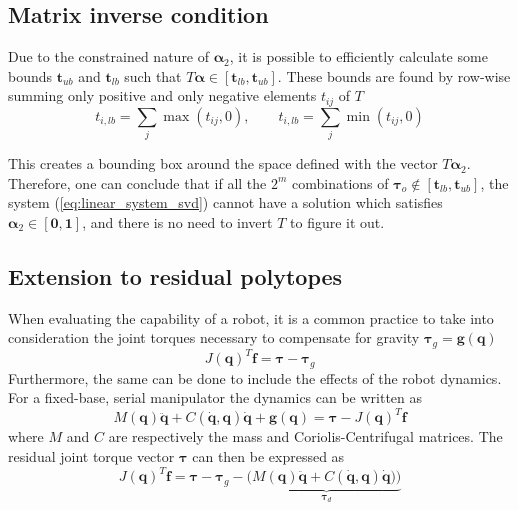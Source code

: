 \subsection{Matrix inverse condition}

Due to the constrained nature of $\bm{\alpha}_2$, it is possible to efficiently calculate some bounds ${\bm{t}_{ub}}$ and $\bm{t}_{lb}$ such that $T\bm{\alpha}  \in [\bm{t}_{lb}, \bm{t}_{ub}]$.
These bounds are found by row-wise summing only positive and only negative elements $t_{ij}$ of  $T$
\begin{equation}
t_{i,lb} = \sum_j \max(t_{ij}, 0), \qquad
t_{i,lb} = \sum_j \min(t_{ij}, 0) 
\label{eq:bounds_condition}
\end{equation}

This creates a bounding box around the space defined with the vector $T\bm{\alpha}_2$. Therefore, one can conclude that if all the $2^m$ combinations of $\bm{\tau}_o \notin [\bm{t}_{lb}, \bm{t}_{ub}] $, the system (\ref{eq:linear_system_svd}) cannot have a solution which satisfies $\bm{\alpha}_2 \in [\bm{0},\bm{1}]$, and there is no need to invert $T$ to figure it out.

\subsection{Extension to residual polytopes}

When evaluating the capability of a robot, it is a common practice to take into consideration the joint torques necessary to compensate for gravity $\bm{\tau}_g = \bm{g}(\bm{q})$ \cite{wei_output_nodate} 
\begin{equation}
    J(\bm{q})^T \bm{f} = \bm{\tau} - \bm{\tau}_g
\end{equation}
Furthermore, the same can be done to include the effects of the robot dynamics. For a fixed-base, serial manipulator the dynamics can be written as
\begin{equation}
    M(\bm{q})\ddot{\bm{q}} + C(\dot{\bm{q}},\bm{q})\dot{\bm{q}} + \bm{g}(\bm{q}) = \bm{\tau} - J(\bm{q})^T \bm{f}
    \label{eq:full_dynamics}
\end{equation}
where $M$ and $C$ are respectively the mass and Coriolis-Centrifugal matrices. The residual joint torque vector $\bm{\tau}$ can then be expressed as
\begin{equation}
    J(\bm{q})^T \bm{f} = \bm{\tau} - \bm{\tau}_g  - \big(\underbrace{M(\bm{q})\ddot{\bm{q}} + C(\dot{\bm{q}},\bm{q})\dot{\bm{q}}) \big)}_{\bm{\tau}_{d}}
    \label{eq:force_dynamics}
\end{equation}

